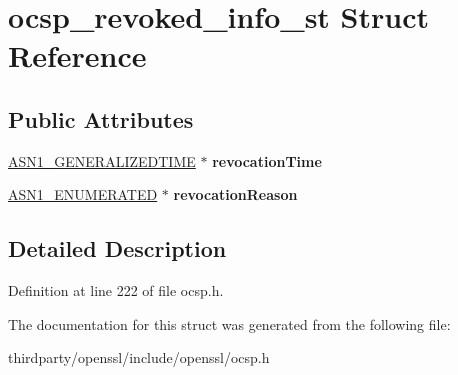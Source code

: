\hypertarget{structocsp__revoked__info__st}{}\section{ocsp\+\_\+revoked\+\_\+info\+\_\+st Struct Reference}
\label{structocsp__revoked__info__st}
\subsection*{Public Attributes}
\begin{DoxyCompactItemize}
\item 
\mbox{\label{structocsp__revoked__info__st_af95cc4676f07ed0d45dfbe2c4b851902}} 
\hyperlink{structasn1__string__st}{A\+S\+N1\+\_\+\+G\+E\+N\+E\+R\+A\+L\+I\+Z\+E\+D\+T\+I\+ME} $\ast$ {\bfseries revocation\+Time}
\item 
\mbox{\label{structocsp__revoked__info__st_a07edd6ecff783b2ad3e0ecf143fdddc3}} 
\hyperlink{structasn1__string__st}{A\+S\+N1\+\_\+\+E\+N\+U\+M\+E\+R\+A\+T\+ED} $\ast$ {\bfseries revocation\+Reason}
\end{DoxyCompactItemize}


\subsection{Detailed Description}


Definition at line 222 of file ocsp.\+h.



The documentation for this struct was generated from the following file\+:\begin{DoxyCompactItemize}
\item 
thirdparty/openssl/include/openssl/ocsp.\+h\end{DoxyCompactItemize}
